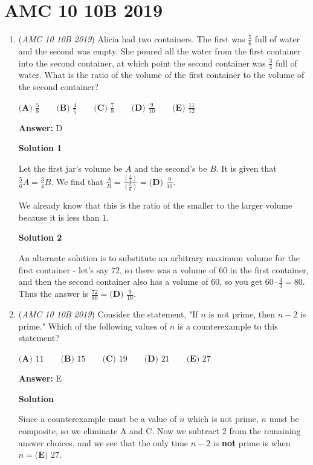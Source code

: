 \section{AMC 10 10B 2019}
        \begin{enumerate}
        	\item (\textit{AMC 10 10B 2019}) Alicia had two containers. The first was $\frac{5}{6}$ full of water and the second was empty. She poured all the water from the first container into the second container, at which point the second container was $\frac{3}{4}$ full of water. What is the ratio of the volume of the first container to the volume of the second container?


 $\textbf{(A) } \frac{5}{8} \qquad \textbf{(B) } \frac{4}{5} \qquad \textbf{(C) } \frac{7}{8} \qquad \textbf{(D) } \frac{9}{10} \qquad \textbf{(E) } \frac{11}{12}$

 \textbf{Answer: }D



\textbf{Solution 1}

Let the first jar's volume be $A$ and the second's be $B$. It is given that $\frac{5}{6}A=\frac{3}{4}B$. We find that $\frac{A}{B}=\frac{\left(\frac{3}{4}\right)}{\left(\frac{5}{6}\right)}=\boxed{\textbf{(D) }\frac{9}{10}}.$ 

 We already know that this is the ratio of the smaller to the larger volume because it is less than $1.$




\textbf{Solution 2}

An alternate solution is to substitute an arbitrary maximum volume for the first container - let's say $72$, so there was a volume of $60$ in the first container, and then the second container also has a volume of $60$, so you get $60 \cdot \frac{4}{3} = 80$. Thus the answer is $\frac{72}{80} = \boxed{\textbf{(D) }\frac{9}{10}}$.

 


	\item (\textit{AMC 10 10B 2019}) Consider the statement, "If $n$ is not prime, then $n-2$ is prime." Which of the following values of $n$ is a counterexample to this statement?


 $\textbf{(A) } 11 \qquad \textbf{(B) } 15 \qquad \textbf{(C) } 19 \qquad \textbf{(D) } 21 \qquad \textbf{(E) } 27$

 \textbf{Answer: }E



\textbf{Solution}

Since a counterexample must be a value of $n$ which is not prime, $n$ must be composite, so we eliminate $\text{A}$ and $\text{C}$. Now we subtract $2$ from the remaining answer choices, and we see that the only time $n-2$ is \textbf{not} prime is when $n = \boxed{\textbf{(E) }27}$.


\end{enumerate}
